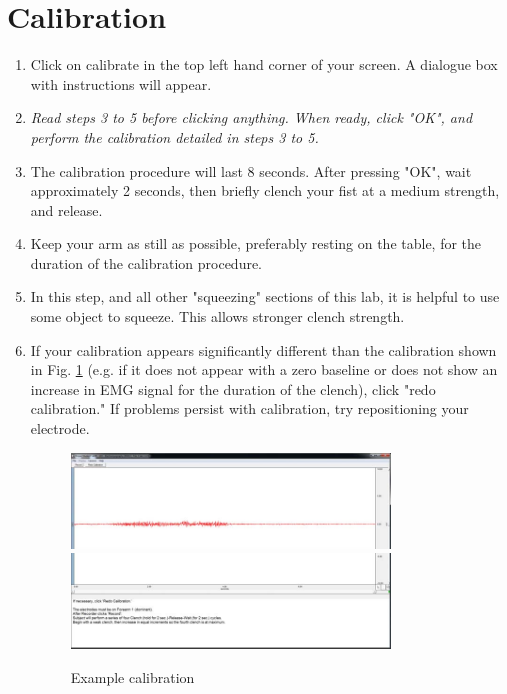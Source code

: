 \documentclass{article}
\begin{document}
\section*{Calibration}
\begin{enumerate}
	\item Click on calibrate in the top left hand corner of your screen. A dialogue box with instructions will appear.
	\item \textit{Read steps 3 to 5 before clicking anything. When ready, click "OK", and perform the calibration detailed in steps 3 to 5.}
	\item The calibration procedure will last 8 seconds. After pressing "OK", wait approximately 2 seconds, then briefly clench your fist at a medium strength, and release.
	\item Keep your arm as still as possible, preferably resting on the table, for the duration of the calibration procedure.
	\item In this step, and all other "squeezing" sections of this lab, it is helpful to use some object to squeeze. This allows stronger clench strength.
	\item If your calibration appears significantly different than the calibration shown in Fig. \ref{calibration} (e.g. if it does not appear with a zero baseline or does not show an increase in EMG signal for the duration of the clench), click "redo calibration." If problems persist with calibration, try repositioning your electrode.
		\begin{figure}[h]
	\includegraphics[width=0.8\textwidth]{../images/EMG_I_8a.jpg}	\includegraphics[width=0.8\textwidth]{../images/EMG_I_8b.jpg}
		\centering
		\caption{Example calibration}
		\label{calibration}
		\end{figure}
\end{enumerate}
\end{document}
